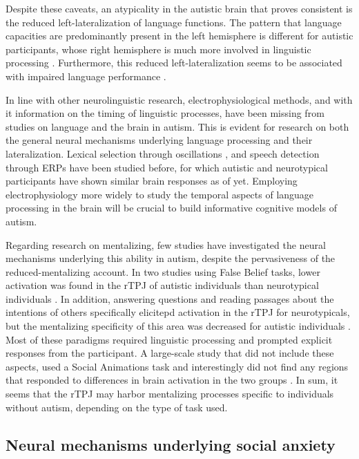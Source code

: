 Despite these caveats, an atypicality in the autistic brain that proves consistent is the reduced left-lateralization of language functions. The pattern that language capacities are predominantly present in the left hemisphere \citep{broca1865,szaflarski2006} is different for autistic participants, whose right hemisphere is much more involved in linguistic processing \citep{eyler2012,jouravlev2020,knaus2008,knaus2010}. Furthermore, this reduced left-lateralization seems to be associated with impaired language performance \citep{cermak2022,lindell2013}. 

In line with other neurolinguistic research, electrophysiological methods, and with it information on the timing of linguistic processes, have been missing from studies on language and the brain in autism. This is evident for research on both the general neural mechanisms underlying language processing and their lateralization. Lexical selection through oscillations \citep{bloy2019}, and speech detection through ERPs \citep{kasai2005,oramcardy2005} have been studied before, for which autistic and neurotypical participants have shown similar brain responses as of yet. Employing electrophysiology more widely to study the temporal aspects of language processing in the brain will be crucial to build informative cognitive models of autism. 

Regarding research on mentalizing, few studies have investigated the neural mechanisms underlying this ability in autism, despite the pervasiveness of the reduced-mentalizing account. In two studies using False Belief tasks, lower activation was found in the rTPJ of autistic individuals than neurotypical individuals \citep{nijhof2018,yuk2018}. In addition, answering questions and reading passages about the intentions of others specifically elicitepd activation in the rTPJ for neurotypicals, but the mentalizing specificity of this area was decreased for autistic individuals \citep{lombardo2011,mason2008}. Most of these paradigms required linguistic processing and prompted explicit responses from the participant. A large-scale study that did not include these aspects, used a Social Animations task and interestingly did not find any regions that responded to differences in brain activation in the two groups \citep{moessnang2020}. In sum, it seems that the rTPJ may harbor mentalizing processes specific to individuals without autism, depending on the type of task used.

\subsection*{Neural mechanisms underlying social anxiety}


